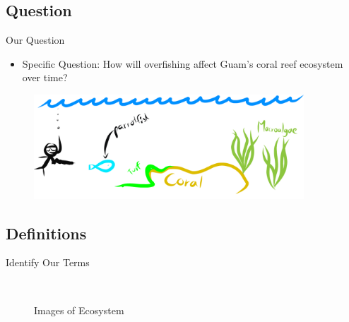 \documentclass{beamer}
\begin{document}
\subsection{Question}
\begin{frame}{Our Question}
\begin{itemize}
    \item Specific Question: How will overfishing affect Guam's coral reef ecosystem over time?
\end{itemize}
\quad
\begin{figure}
    \centering
    \includegraphics[width=0.9\textwidth]{Latex/Figures/figure1.png}
\end{figure}
\end{frame}

\subsection{Definitions}
\begin{frame}{Identify Our Terms}
\vspace{-0.2cm}
    \begin{figure}%
        \centering
        \\
        \qquad
        \caption{Images of Ecosystem}%
        \label{fig:graphs}%
    \end{figure}
\end{frame}
\end{document}
